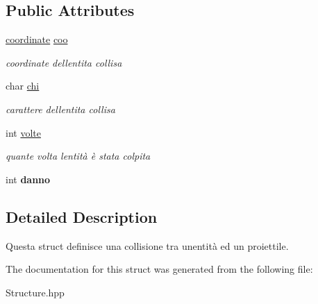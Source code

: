 \subsection*{Public Attributes}
\begin{DoxyCompactItemize}
\item 
\hypertarget{structcollisione_aaf479a890eeb967854b96931cb517dbe}{}\hyperlink{structcoordinate}{coordinate} \hyperlink{structcollisione_aaf479a890eeb967854b96931cb517dbe}{coo}\label{structcollisione_aaf479a890eeb967854b96931cb517dbe}

\begin{DoxyCompactList}\small\item\em coordinate dell\textquotesingle{}entita collisa \end{DoxyCompactList}\item 
\hypertarget{structcollisione_adb4901ff23217f71261e39108936b612}{}char \hyperlink{structcollisione_adb4901ff23217f71261e39108936b612}{chi}\label{structcollisione_adb4901ff23217f71261e39108936b612}

\begin{DoxyCompactList}\small\item\em carattere dell\textquotesingle{}entita collisa \end{DoxyCompactList}\item 
\hypertarget{structcollisione_a473c8f33976fa65d868b0b19c44001d3}{}int \hyperlink{structcollisione_a473c8f33976fa65d868b0b19c44001d3}{volte}\label{structcollisione_a473c8f33976fa65d868b0b19c44001d3}

\begin{DoxyCompactList}\small\item\em quante volta l\textquotesingle{}entità è stata colpita \end{DoxyCompactList}\item 
\hypertarget{structcollisione_a3d7c2d8bc4438556813228157d31f812}{}int {\bfseries danno}\label{structcollisione_a3d7c2d8bc4438556813228157d31f812}

\end{DoxyCompactItemize}


\subsection{Detailed Description}
Questa struct definisce una collisione tra un\textquotesingle{}entità ed un proiettile. 

The documentation for this struct was generated from the following file\+:\begin{DoxyCompactItemize}
\item 
Structure.\+hpp\end{DoxyCompactItemize}

